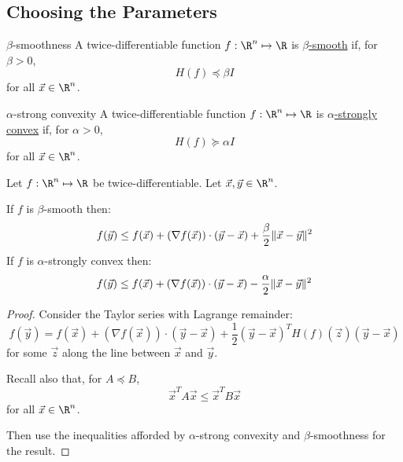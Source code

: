 \documentclass[../Main.tex]{subfiles}
\begin{document}
\subsection{Choosing the Parameters}
\begin{definition}{$\beta$-smoothness}
    A twice-differentiable function $f : \R^n \mapsto \R$ is \underline{$\beta$-smooth} if, for $\beta > 0$,
    \begin{equation*}
        H(f) \preceq \beta I
    \end{equation*}
    for all $\vec{x} \in \R^n$.
\end{definition}
\begin{definition}{$\alpha$-strong convexity}
    A twice-differentiable function $f : \R^n \mapsto \R$ is \underline{$\alpha$-strongly convex} if, for $\alpha > 0$,
    \begin{equation*}
        H(f) \succeq \alpha I
    \end{equation*}
    for all $\vec{x} \in \R^n$.
\end{definition}
\begin{theorem}
    Let $f : \R^n \mapsto \R$ be twice-differentiable. Let $\vec{x}, \vec{y} \in \R^n$.

    If $f$ is $\beta$-smooth then:
    \begin{equation*}
        f(\vec{y}) \leq f(\vec{x}) + (\nabla f(\vec{x})) \cdot (\vec{y} - \vec{x}) + \frac{\beta}{2}\lVert\vec{x} - \vec{y}\rVert^2
    \end{equation*}
    If $f$ is $\alpha$-strongly convex then:
    \begin{equation*}
        f(\vec{y}) \leq f(\vec{x}) + (\nabla f(\vec{x})) \cdot (\vec{y} - \vec{x}) - \frac{\alpha}{2}\lVert\vec{x} - \vec{y}\rVert^2
    \end{equation*}
    \label{thmConvexityBounds}
\end{theorem}
\begin{proof}
    Consider the Taylor series with Lagrange remainder:
    \begin{equation*}
        f(\vec{y}) = f(\vec{x}) + (\nabla f(\vec{x})) \cdot (\vec{y} - \vec{x}) + \frac12 (\vec{y} - \vec{x})^T H(f)(\vec{z}) (\vec{y} - \vec{x})
    \end{equation*}
    for some $\vec{z}$ along the line between $\vec{x}$ and $\vec{y}$.

    Recall also that, for $A \preceq B$,
    \begin{equation*}
        \vec{x}^T A \vec{x} \leq \vec{x}^T B \vec{x}
    \end{equation*}
    for all $\vec{x} \in \R^n$.

    Then use the inequalities afforded by $\alpha$-strong convexity and $\beta$-smoothness for the result.
\end{proof}
\end{document}
